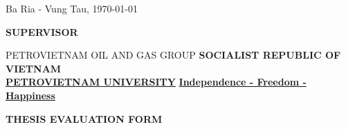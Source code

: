 \documentclass[12pt,a4paper]{report}
\begin{document}
\begin{flushright}
Ba Ria - Vung Tau, \today
\end{flushright}
\hspace{300pt} \textbf{SUPERVISOR}\\
\newpage



\newpage
\begingroup
\fontsize{10pt}{12pt}\selectfont
PETROVIETNAM OIL AND GAS GROUP \hspace*{1.5cm} \textbf{SOCIALIST REPUBLIC OF VIETNAM}\\
\hspace*{0.5cm}\underline{\textbf{PETROVIETNAM UNIVERSITY}} \hspace*{2.4cm} \underline{\textbf{Independence - Freedom - Happiness}}
\endgroup

\begin{center}
	\centering
	\textbf{THESIS EVALUATION FORM}\\
\end{center}
\end{document}

